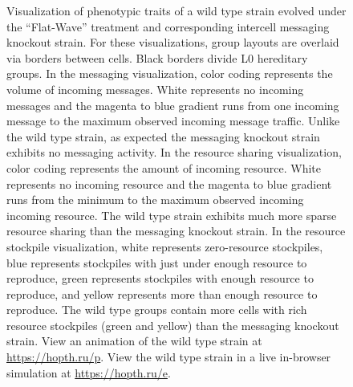 \begin{figure}[!htbp]
\begin{center}
\caption{
Visualization of phenotypic traits of a wild type strain evolved under the ``Flat-Wave'' treatment and corresponding intercell messaging knockout strain.
For these visualizations, group layouts are overlaid via borders between cells.
Black borders divide L0 hereditary groups.
In the messaging visualization, color coding represents the volume of incoming messages.
White represents no incoming messages and the magenta to blue gradient runs from one incoming message to the maximum observed incoming message traffic.
Unlike the wild type strain, as expected the messaging knockout strain exhibits no messaging activity.
In the resource sharing visualization, color coding represents the amount of incoming resource.
White represents no incoming resource and the magenta to blue gradient runs from the minimum to the maximum observed incoming incoming resource.
The wild type strain exhibits much more sparse resource sharing than the messaging knockout strain.
In the resource stockpile visualization, white represents zero-resource stockpiles, blue represents stockpiles with just under enough resource to reproduce, green represents stockpiles with enough resource to reproduce, and yellow represents more than enough resource to reproduce.
The wild type groups contain more cells with rich resource stockpiles (green and yellow) than the messaging knockout strain.
View an animation of the wild type strain at \url{https://hopth.ru/p}.
View the wild type strain in a live in-browser simulation at \url{https://hopth.ru/e}.
}
\label{fig:ko-intermessaging-sharing}
\end{center}
\end{figure}
